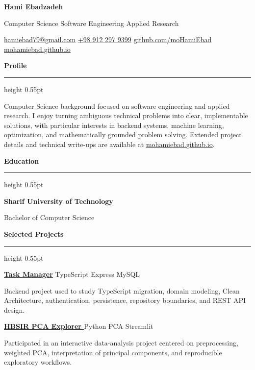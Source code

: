 \documentclass[10pt,a4paper]{article}
\newcommand{\cvsection}[1]{%
  \vspace{0.72em}%
  {\large\bfseries\color{cvAccent} #1}\par
  \vspace{0.16em}%
  {\color{cvRule}\hrule height 0.55pt}\par
  \vspace{0.42em}%
}
\newcommand{\project}[4]{%
  \textbf{\href{#2}{#1}}%
  \hfill%
  {\small\color{cvMuted} #3}\par
  \vspace{0.12em}%
  #4\par
  \vspace{0.42em}%
}
\begin{document}
{\fontsize{22}{24}\selectfont\bfseries Hami Ebadzadeh}\par
\vspace{0.12em}
{\large\color{cvMuted} Computer Science \textperiodcentered{} Software Engineering \textperiodcentered{} Applied Research}\par
\vspace{0.38em}

{\small
\href{mailto:hamiebad79@gmail.com}{hamiebad79@gmail.com}
\quad\textperiodcentered\quad
\href{tel:+989122979399}{+98 912 297 9399}
\quad\textperiodcentered\quad
\href{https://github.com/moHamiEbad}{github.com/moHamiEbad}
\quad\textperiodcentered\quad
\href{https://mohamiebad.github.io}{mohamiebad.github.io}
}\par

\cvsection{Profile}
Computer Science background focused on software engineering and applied research. I enjoy turning ambiguous technical problems into clear, implementable solutions, with particular interests in backend systems, machine learning, optimization, and mathematically grounded problem solving. Extended project details and technical write-ups are available at \href{https://mohamiebad.github.io}{mohamiebad.github.io}.

\cvsection{Education}
\textbf{Sharif University of Technology}\par
Bachelor of Computer Science

\cvsection{Selected Projects}

\project
  {Task Manager}
  {https://github.com/moHamiEbad/task-manager}
  {TypeScript \textperiodcentered{} Express \textperiodcentered{} MySQL}
  {Backend project used to study TypeScript migration, domain modeling, Clean Architecture, authentication, persistence, repository boundaries, and REST API design.}

\project
  {HBSIR PCA Explorer \normalfont{\small\color{cvMuted}(Participated)}}
  {https://github.com/moHamiEbad/hbsir-pca-app}
  {Python \textperiodcentered{} PCA \textperiodcentered{} Streamlit}
  {Participated in an interactive data-analysis project centered on preprocessing, weighted PCA, interpretation of principal components, and reproducible exploratory workflows.}
\end{document}
